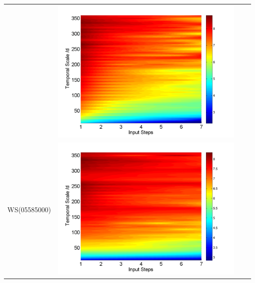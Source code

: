 \documentclass[draft,wrr]{AGUTeX}
\begin{document}
\begin{article}
\begin{table}[H]
\begin{tabular}{cccc}
&\begin{minipage}{.3\textwidth}\includegraphics[width=\linewidth]{resultgraph/02143000pepq_abs.png}\end{minipage}
\\
WS(05585000)
&\begin{minipage}{.3\textwidth}\includegraphics[width=\linewidth]{resultgraph/05585000p_abs.png}\end{minipage}

\end{tabular}
\end{table}
\end{article}
\end{document}

